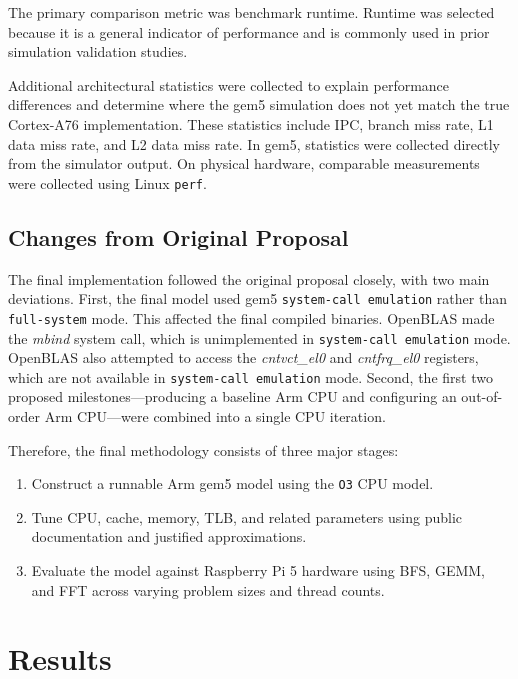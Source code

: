 \documentclass[acmlarge]{acmart}
\begin{document}
The primary comparison metric was benchmark runtime. Runtime was selected because
it is a general indicator of performance and is commonly used in prior simulation
validation studies\cite{Butko2012-vg,Endo2014-ca}.

Additional architectural statistics were collected to explain performance
differences and determine where the gem5 simulation does not yet match the true
Cortex-A76 implementation. These statistics include IPC, branch miss rate, L1
data miss rate, and L2 data miss rate. In gem5, statistics were collected
directly from the simulator output. On physical hardware, comparable measurements
were collected using Linux \texttt{perf}.

\subsection{Changes from Original Proposal}

The final implementation followed the original proposal closely, with two main
deviations. First, the final model used gem5 \texttt{system-call emulation}
rather than \texttt{full-system} mode. This affected the final compiled binaries.
OpenBLAS made the \textit{mbind} system call, which is unimplemented in
\texttt{system-call emulation} mode. OpenBLAS also attempted to access the
\textit{cntvct\_el0} and \textit{cntfrq\_el0} registers, which are not available
in \texttt{system-call emulation} mode. Second, the first two proposed
milestones---producing a baseline Arm CPU and configuring an out-of-order Arm
CPU---were combined into a single CPU iteration.

Therefore, the final methodology consists of three major stages:

\begin{enumerate}
  \item Construct a runnable Arm gem5 model using the \texttt{O3} CPU model.
  \item Tune CPU, cache, memory, TLB, and related parameters using public documentation and justified approximations.
  \item Evaluate the model against Raspberry Pi 5 hardware using BFS, GEMM, and FFT across varying problem sizes and thread counts.
\end{enumerate}

\section{Results}
\end{document}
